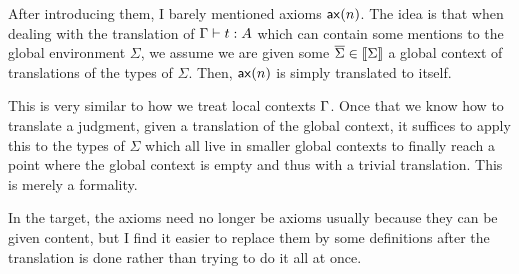 After introducing them, I barely mentioned axioms \(\mathsf{ax}(n)\).
The idea is that when dealing with the translation of \(\Gamma \vdash t : A\)
which can contain some mentions to the global environment \(\Sigma\),
we assume we are given some \(\overline{\Sigma} \in \llbracket \Sigma \rrbracket\)
a global context of translations of the types of \(\Sigma\).
Then, \(\mathsf{ax}(n)\) is simply translated to itself.

This is very similar to how we treat local contexts \(\Gamma\).
Once that we know how to translate a judgment, given a translation of the
global context, it suffices to apply this to the types of \(\Sigma\) which all
live in smaller global contexts to finally reach a point where the global
context is empty and thus with a trivial translation.
This is merely a formality.

In the target, the axioms need no longer be axioms usually because they can be
given content, but I find it easier to replace them by some definitions after
the translation is done rather than trying to do it all at once.